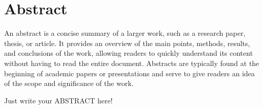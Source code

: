 \chapter*{Abstract}

An abstract is a concise summary of a larger work, such as a research paper, thesis, or article. It provides an overview of the main points, methods, results, and conclusions of the work, allowing readers to quickly understand its content without having to read the entire document. Abstracts are typically found at the beginning of academic papers or presentations and serve to give readers an idea of the scope and significance of the work.

Just write your ABSTRACT here!


\newpage
